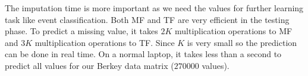 The imputation time is more important as we need the values for further learning task like event classification.
Both MF and TF are very efficient in the testing phase.
To predict a missing value, it takes $2K$ multiplication operations to MF and $3K$ multiplication operations to TF.
Since $K$ is very small so the prediction can be done in real time.
On a normal laptop, it takes less than a second to predict all values for our Berkey data matrix ($270000$ values).

